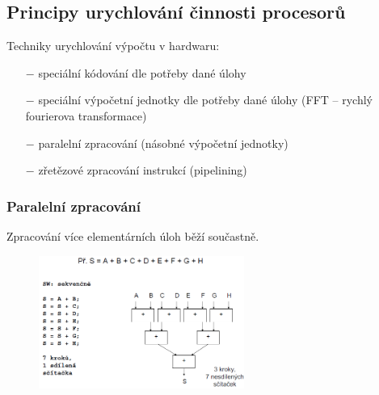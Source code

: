 \subsection{Principy urychlování činnosti procesorů}
Techniky urychlování výpočtu v hardwaru:
\begin{itemize}
	\item[$-$]{speciální kódování dle potřeby dané úlohy}
	\item[$-$]{speciální výpočetní jednotky dle potřeby dané úlohy (FFT -- rychlý fourierova transformace)}
	\item[$-$]{paralelní zpracování (násobné výpočetní jednotky)}
	\item[$-$]{zřetězové zpracování instrukcí (pipelining)}
\end{itemize}
\subsubsection{Paralelní zpracování}
Zpracování více elementárních úloh běží součastně.
\begin{figure}[H]
\centering
\includegraphics[width=0.6\textwidth]{assets/1_paralelni_zpracovani.png}
\end{figure}

